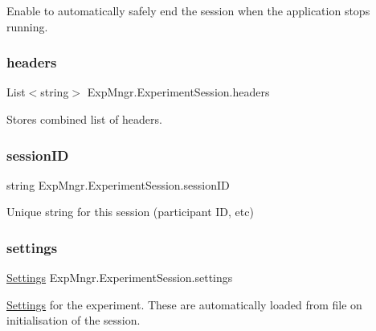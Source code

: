 Enable to automatically safely end the session when the application stops running. 

\mbox{\label{class_exp_mngr_1_1_experiment_session_a828dd54e48d385da1064078ad68fdc82}} 
\subsubsection{\texorpdfstring{headers}{headers}}
{\footnotesize\ttfamily List$<$string$>$ Exp\+Mngr.\+Experiment\+Session.\+headers}



Stores combined list of headers. 

\mbox{\label{class_exp_mngr_1_1_experiment_session_af7496db421f1d8719c0be1a93a69ae83}} 
\subsubsection{\texorpdfstring{session\+ID}{sessionID}}
{\footnotesize\ttfamily string Exp\+Mngr.\+Experiment\+Session.\+session\+ID}



Unique string for this session (participant ID, etc) 

\mbox{\label{class_exp_mngr_1_1_experiment_session_a93888535df3ee8dc4099fdc47d729d9c}} 
\subsubsection{\texorpdfstring{settings}{settings}}
{\footnotesize\ttfamily \hyperlink{class_exp_mngr_1_1_settings}{Settings} Exp\+Mngr.\+Experiment\+Session.\+settings}



\hyperlink{class_exp_mngr_1_1_settings}{Settings} for the experiment. These are automatically loaded from file on initialisation of the session. 

